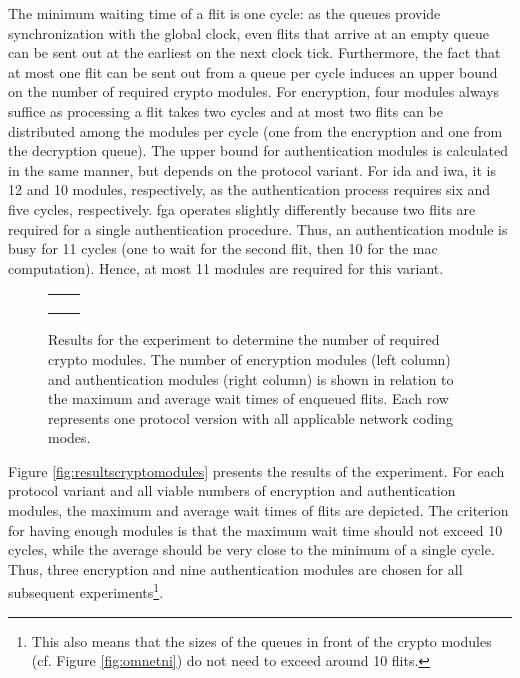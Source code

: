 The minimum waiting time of a flit is one cycle: as the queues provide synchronization with the global clock, even flits that arrive at an empty queue
can be sent out at the earliest on the next clock tick. Furthermore, the fact that at most one flit can be sent out from a queue per cycle induces an
upper bound on the number of required crypto modules. For encryption, four modules always suffice as processing a flit takes two cycles and at most two
flits can be distributed among the modules per cycle (one from the encryption and one from the decryption queue). The upper bound for authentication
modules is calculated in the same manner, but depends on the protocol variant. For \gls{ida} and \gls{iwa}, it is 12 and 10 modules, respectively, as
the authentication process requires six and five cycles, respectively. \Gls{fga} operates slightly differently because two flits are required for a
single authentication procedure. Thus, an authentication module is busy for 11 cycles (one to wait for the second flit, then 10 for the \gls{mac}
computation). Hence, at most 11 modules are required for this variant.

\begin{figure}
    \centering
    \begin{tabular}{cc}
         &  \\
         &  \\
         & 
    \end{tabular}
    \caption[Results for number of crypto modules experiment]{Results for the experiment to determine the number of required crypto modules. The
    number of encryption modules (left column) and authentication modules (right column) is shown in relation to the maximum and average wait times of
    enqueued flits. Each row represents one protocol version with all applicable network coding modes.}
    \label{fig:resultscryptomodules}
\end{figure}

Figure \vref{fig:resultscryptomodules} presents the results of the experiment. For each protocol variant and all viable numbers of encryption and
authentication modules, the maximum and average wait times of flits are depicted. The criterion for having enough modules is that the maximum wait
time should not exceed 10 cycles, while the average should be very close to the minimum of a single cycle. Thus, three encryption and nine
authentication modules are chosen for all subsequent experiments\footnote{This also means that the sizes of the queues in front of the crypto modules
(cf. Figure \ref{fig:omnetni}) do not need to exceed around 10 flits.}.

